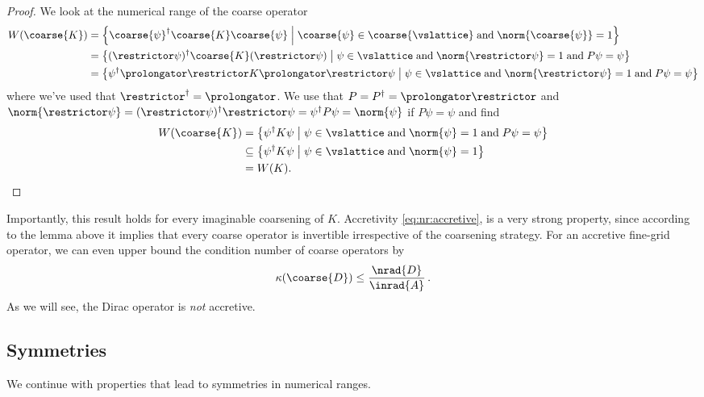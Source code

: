 \begin{proof}
We look at the numerical range of the coarse operator
\begin{align*}
W({\coarse{K}})
&= \left\{ \coarse{\psi}^\dagger \coarse{K} \coarse{\psi} \; \middle| \; \coarse{\psi} \in \coarse{\vslattice} \; \text{and} \; \norm{\coarse{\psi}} = 1 \right\} \\
&= \left\{ (\restrictor \psi)^\dagger \coarse{K} (\restrictor \psi) \; \middle| \; \psi \in \vslattice \; \text{and} \; \norm{\restrictor \psi} = 1 \; \text{and} \; P \psi = \psi \right\} \\
&= \left\{ \psi^\dagger \prolongator \restrictor K \prolongator \restrictor \psi \; \middle| \; \psi \in \vslattice \; \text{and} \; \norm{\restrictor \psi} = 1 \; \text{and} \; P \psi = \psi \right\}
\end{align*}
where we've used that $\restrictor^\dagger = \prolongator$. We use that $P = P^\dagger = \prolongator \restrictor$ and $\norm{\restrictor \psi} = (\restrictor \psi)^\dagger \restrictor \psi = \psi^\dagger P \psi = \norm{\psi}$ if $P \psi = \psi$ and find
\begin{align*}
W({\coarse{K}})
&= \left\{ \psi^\dagger K \psi \; \middle| \; \psi \in \vslattice \; \text{and} \; \norm{\psi} = 1 \; \text{and} \; P \psi = \psi \right\} \\
&\subseteq \left\{ \psi^\dagger K \psi \; \middle| \; \psi \in \vslattice \; \text{and} \; \norm{\psi} = 1 \right\} \\
&= W({K}).
\end{align*}
\end{proof}

Importantly, this result holds for every imaginable coarsening of $K$.
Accretivity \cref{eq:nr:accretive}, is a very strong property, since according to the lemma above it implies that every coarse operator is invertible irrespective of the coarsening strategy.
For an accretive fine-grid operator, we can even upper bound the condition number of coarse operators by
\begin{equation}
\kappa(\coarse{D}) \leq \frac{\nrad{D}}{ \inrad{A} } \,.
\end{equation}
As we will see, the Dirac operator is \emph{not} accretive.

\subsection{Symmetries}

We continue with properties that lead to symmetries in numerical ranges.

